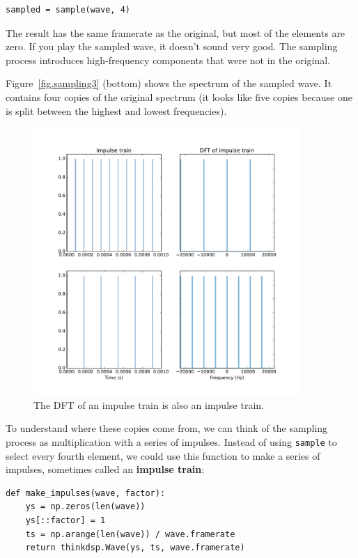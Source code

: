\documentclass[12pt]{book}
\begin{document}
\begin{verbatim}
sampled = sample(wave, 4)
\end{verbatim}

The result has the same framerate as  the original, but most of the
elements are zero.  If you play the sampled wave, it doesn't sound
very good.  The sampling process introduces high-frequency
components that were not in the original.

Figure~\ref{fig.sampling3} (bottom) shows the spectrum of the sampled
wave.  It contains four copies of the original spectrum (it looks like
five copies because one is split between the highest and lowest
frequencies).

\begin{figure}
\centerline{\includegraphics[height=4in]{figs/sampling9.pdf}}
\caption{The DFT of an impulse train is also an impulse train.}
\label{fig.sampling9}
\end{figure}

To understand where these copies come from, we can think of the
sampling process as multiplication with a series of impulses.  Instead
of using {\tt sample} to select every fourth element, we could use
this function to make a series of impulses, sometimes called an
{\bf impulse train}:
 
\begin{verbatim}
def make_impulses(wave, factor):
    ys = np.zeros(len(wave))
    ys[::factor] = 1
    ts = np.arange(len(wave)) / wave.framerate
    return thinkdsp.Wave(ys, ts, wave.framerate)
\end{verbatim}
\end{document}
